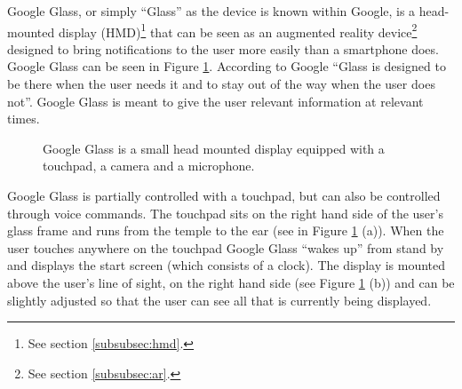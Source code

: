 Google Glass, or simply ``Glass'' as the device is known within Google, is a head-mounted display (HMD)\footnote{See section \ref{subsubsec:hmd}.} that can be seen as an augmented reality device\footnote{See section \ref{subsubsec:ar}.} designed to bring notifications to the user more easily than a smartphone does. Google Glass can be seen in Figure \ref{GoogleGlassHardware}. According to Google ``Glass is designed to be there when the user needs it and to stay out of the way when the user does not''.\cite{glassDesignPrinciples} Google Glass is meant to give the user relevant information at relevant times.

	\begin{figure}[ht!]
		\centering
    \qquad
    \qquad
		\caption{Google Glass is a small head mounted display equipped with a touchpad, a camera and a microphone.\cite{ImagesGoogleGlassUI}}
		\label{GoogleGlassHardware}
	\end{figure}

Google Glass is partially controlled with a touchpad, but can also be controlled through voice commands. The touchpad sits on the right hand side of the user's glass frame and runs from the temple to the ear (see in Figure \ref{GoogleGlassHardware} (a)). When the user touches anywhere on the touchpad Google Glass ``wakes up'' from stand by and displays the start screen (which consists of a clock). The display is mounted above the user's line of sight, on the right hand side (see Figure \ref{GoogleGlassHardware} (b)) and can be slightly adjusted so that the user can see all that is currently being displayed.

